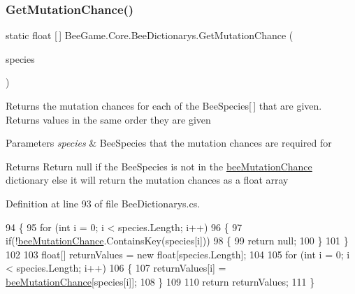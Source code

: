 \subsubsection{\texorpdfstring{Get\+Mutation\+Chance()}{GetMutationChance()}\hspace{0.1cm}{\footnotesize\ttfamily [2/2]}}
{\footnotesize\ttfamily static float \mbox{[}$\,$\mbox{]} Bee\+Game.\+Core.\+Bee\+Dictionarys.\+Get\+Mutation\+Chance (\begin{DoxyParamCaption}\item[{\hyperlink{namespace_bee_game_1_1_enums_aa2ead984825678d83c42d48f6382619c}{Bee\+Species} \mbox{[}$\,$\mbox{]}}]{species }\end{DoxyParamCaption})\hspace{0.3cm}{\ttfamily [static]}}



Returns the mutation chances for each of the Bee\+Species\mbox{[}$\,$\mbox{]} that are given. Returns values in the same order they are given 


\begin{DoxyParams}{Parameters}
{\em species} & Bee\+Species that the mutation chances are required for\\
\hline
\end{DoxyParams}
\begin{DoxyReturn}{Returns}
Return null if the Bee\+Species is not in the \hyperlink{class_bee_game_1_1_core_1_1_bee_dictionarys_a8928aea7b0d5b04fbf7b5055a9921385}{bee\+Mutation\+Chance} dictionary else it will return the mutation chances as a float array
\end{DoxyReturn}


Definition at line 93 of file Bee\+Dictionarys.\+cs.


\begin{DoxyCode}
94         \{
95             \textcolor{keywordflow}{for} (\textcolor{keywordtype}{int} i = 0; i < species.Length; i++)
96             \{
97                 \textcolor{keywordflow}{if}(!\hyperlink{class_bee_game_1_1_core_1_1_bee_dictionarys_a8928aea7b0d5b04fbf7b5055a9921385}{beeMutationChance}.ContainsKey(species[i]))
98                 \{
99                     \textcolor{keywordflow}{return} null;
100                 \}
101             \}
102 
103             \textcolor{keywordtype}{float}[] returnValues = \textcolor{keyword}{new} \textcolor{keywordtype}{float}[species.Length];
104 
105             \textcolor{keywordflow}{for} (\textcolor{keywordtype}{int} i = 0; i < species.Length; i++)
106             \{
107                 returnValues[i] = \hyperlink{class_bee_game_1_1_core_1_1_bee_dictionarys_a8928aea7b0d5b04fbf7b5055a9921385}{beeMutationChance}[species[i]];
108             \}
109 
110             \textcolor{keywordflow}{return} returnValues;
111         \}
\end{DoxyCode}


